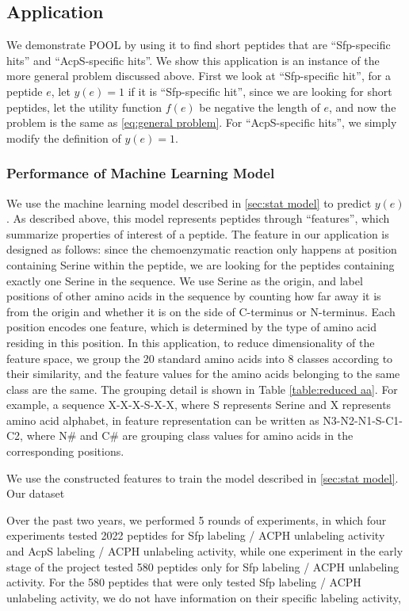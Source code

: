 \subsection{Application} \label{sec:application}
We demonstrate POOL by using it to find short peptides that are \enquote{Sfp-specific hits} and \enquote{AcpS-specific hits}. 
We show this application is an instance of the more general problem discussed above. First we look at \enquote{Sfp-specific hit}, for a peptide $e$, let $y(e) = 1$ if it is \enquote{Sfp-specific hit}, since we are looking for short peptides, let the utility function $f(e)$ be negative the length of $e$, and now the problem is the same as \eqref{eq:general problem}. For \enquote{AcpS-specific hits}, we simply modify the definition of $y(e)=1$.

\subsubsection{Performance of Machine Learning Model} \label{sec:application_roc}
We use the machine learning model described in \ref{sec:stat model} to predict $y(e)$. 
As described above, this model represents peptides through \enquote{features}, which summarize properties of interest of a peptide. The feature in our application is designed as follows: since the chemoenzymatic reaction only happens at position containing Serine within the peptide, we are looking for the peptides containing exactly one Serine in the sequence. We use Serine as the origin, and label positions of other amino acids in the sequence by counting how far away it is from the origin and whether it is on the side of C-terminus or N-terminus. Each position encodes one feature, which is determined by the type of amino acid residing in this position. In this application, to reduce dimensionality of the feature space, we group the 20 standard amino acids into 8 classes according to their similarity, and the feature values for the amino acids belonging to the same class are the same. The grouping detail is shown in Table \ref{table:reduced aa}. For example, a sequence X-X-X-S-X-X, where S represents Serine and X represents amino acid alphabet, in feature representation can be written as N3-N2-N1-S-C1-C2, where N\# and C\# are grouping class values for amino acids in the corresponding positions.

We use the constructed features to train the model described in \ref{sec:stat model}. Our dataset 


Over the past two years, we performed 5 rounds of experiments, in which four experiments tested 2022 peptides for Sfp labeling / ACPH unlabeling activity and AcpS labeling / ACPH unlabeling activity, while one experiment in the early stage of the project tested 580 peptides only for Sfp labeling / ACPH unlabeling activity. For the 580 peptides that were only tested Sfp labeling / ACPH unlabeling activity, we do not have information on their specific labeling activity, 


